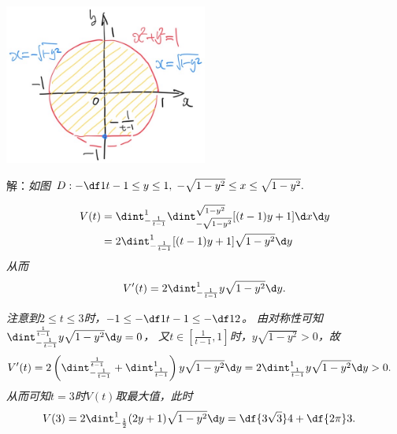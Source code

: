 \begin{frame}
	\linespread{1.5}
	
	\begin{center}
		\includegraphics[width=0.5\textwidth]{./images/ch10/10.2.3.jpg}
	\end{center}
	
	\small 解：\it 如图
	$D:-\df1{t-1}\leq y\leq 1,\;-\sqrt{1-y^2}\leq x\leq \sqrt{1-y^2}.$
\end{frame}

\begin{frame}
	\linespread{1.5}
	\small\it 
	\begin{align*}
		V(t)&=\dint_{-\frac1{t-1}}^1\dint_{-\sqrt{1-y^2}}^{\sqrt{1-y^2}}
		[(t-1)y+1]\d x\d y\\
		&=2\dint_{-\frac1{t-1}}^1[(t-1)y+1]\sqrt{1-y^2}\d y
	\end{align*}
	从而
	$$V'(t)=2\dint_{-\frac1{t-1}}^1y\sqrt{1-y^2}\d y.$$
	
\end{frame}

\begin{frame}
	\linespread{1.5}
	\small\it 
	注意到$2\leq t\leq 3$时，$-1\leq-\df1{t-1}\leq-\df12$。
	由对称性可知
	$\dint_{-\frac1{t-1}}^{\frac1{t-1}}y\sqrt{1-y^2}\d y=0$，
	又$t\in\left[\frac1{t-1},1\right]$时，$y\sqrt{1-y^2}>0$，故
	\begin{align*}
		V'(t)&=2\left(\dint_{-\frac1{t-1}}^{\frac1{t-1}}+
		\dint_{\frac1{t-1}}^1\right)y\sqrt{1-y^2}\d y
		=2\dint_{\frac1{t-1}}^1y\sqrt{1-y^2}\d y>0.
	\end{align*}
	从而可知$t=3$时$V(t)$取最大值，此时
	\begin{align*}
		V(3)&=2\dint_{-\frac12}^1(2y+1)\sqrt{1-y^2}\d y
		=\df{3\sqrt3}4+\df{2\pi}3.
	\end{align*}
	\fin
\end{frame}


